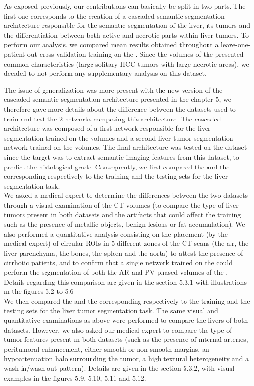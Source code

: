 \documentclass{article}
\begin{document}
\begin{itemize}
As exposed previously, our contributions can basically be split in two parts. The first one corresponds to the creation of a cascaded semantic segmentation architecture responsible for the semantic segmentation of the liver, its tumors and the differentiation between both active and necrotic parts within liver tumors.
To perform our analysis, we compared mean results obtained throughout a leave-one-patient-out cross-validation training on the . Since the volumes of the  presented common characteristics (large solitary HCC tumors with large necrotic areas), we decided to not perform any supplementary analysis on this dataset.

The issue of generalization was more present with the new version of the cascaded semantic segmentation architecture presented in the chapter 5, we therefore gave more details about the difference between the datasets used to train and test the 2 networks composing this architecture.
The cascaded architecture was composed of a first network responsible for the liver segmentation trained on the  volumes and a second liver tumor segmentation network trained on the  volumes. The final architecture was tested on the  dataset since the target was to extract semantic imaging features from this dataset, to predict the histological grade.
Consequently, we first compared the  and the  corresponding respectively to the training and the testing sets for the liver segmentation task.\\
We asked a medical expert to determine the differences between the two datasets through a visual examination of the CT volumes (to compare the type of liver tumors present in both datasets and the artifacts that could affect the training such as the presence of metallic objects, benign lesions or fat accumulation). We also performed a quantitative analysis consisting on the placement (by the medical expert) of circular ROIs in 5 different zones of the CT scans (the air, the liver parenchyma, the bones, the spleen and the aorta) to attest the presence of cirrhotic patients, and to confirm that a single network trained on the  could perform the segmentation of both the AR and PV-phased volumes of the . Details regarding this comparison are given in the section 5.3.1 with illustrations in the figures 5.2 to 5.6 \\
We then compared the  and the  corresponding respectively to the training and the testing sets for the liver tumor segmentation task.
The same visual and quantitative examinations as above were performed to compare the livers of both datasets. However, we also asked our medical expert to compare the type of tumor features present in both datasets (such as the presence of internal arteries, peritumoral enhancement, either smooth or non-smooth margins, an hypoattenuation halo surrounding the tumor, a high textural heterogeneity and a wash-in/wash-out pattern). Details are given in the section 5.3.2, with visual examples in the figures 5.9, 5.10, 5.11 and 5.12.\\


\end{itemize}
\end{document}
